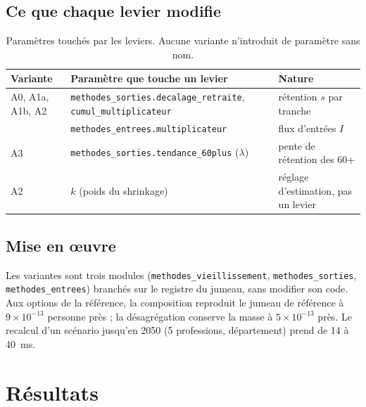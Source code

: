 \documentclass[11pt]{article}
\begin{document}
\subsection{Ce que chaque levier modifie}
\begin{table}[h]
\centering\small
\begin{tabular}{@{}p{}p{}p{}@{}}
\toprule
Variante & Paramètre que touche un levier & Nature \\
\midrule
A0, A1a, A1b, A2 & \texttt{methodes\_sorties.}\allowbreak\texttt{decalage\_retraite}, \texttt{cumul\_multiplicateur} & rétention $s$ par tranche \\
 & \texttt{methodes\_entrees.multiplicateur} & flux d'entrées $I$ \\
A3 & \texttt{methodes\_sorties.tendance\_60plus} ($\lambda$) & pente de rétention des 60+ \\
A2 & $k$ (poids du shrinkage) & réglage d'estimation, pas un levier \\
\bottomrule
\end{tabular}
\caption{Paramètres touchés par les leviers. Aucune variante n'introduit de paramètre sans nom.}
\end{table}

\subsection{Mise en \oe{}uvre}
Les variantes sont trois modules (\texttt{methodes\_vieillissement}, \texttt{methodes\_sorties},
\texttt{methodes\_entrees}) branchés sur le registre du jumeau, sans modifier son code. Aux options de
la référence, la composition reproduit le jumeau de référence à $9 \times 10^{-13}$\mesure{} personne
près ; la désagrégation conserve la masse à $5 \times 10^{-13}$\mesure{} près. Le recalcul d'un
scénario jusqu'en 2050 (5 professions, département) prend de 14 à 40\mesure{}~ms.

\section{Résultats}
\end{document}
